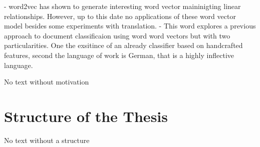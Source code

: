 - word2vec has shown to generate interesting word vector maininigting linear relationships. However, up to this date no applications of these word vector model besides some experiments with translation. 
- This word explores a previous approach to document classificaion using word word vectors but with two particularities. One the exsitince of an already classifier based on handcrafted features, second the language of work is German, that is a highly inflective language. 


No text without motivation


\section{Structure of the Thesis}
\label{sec:structure-thesis}
No text without a structure




 



